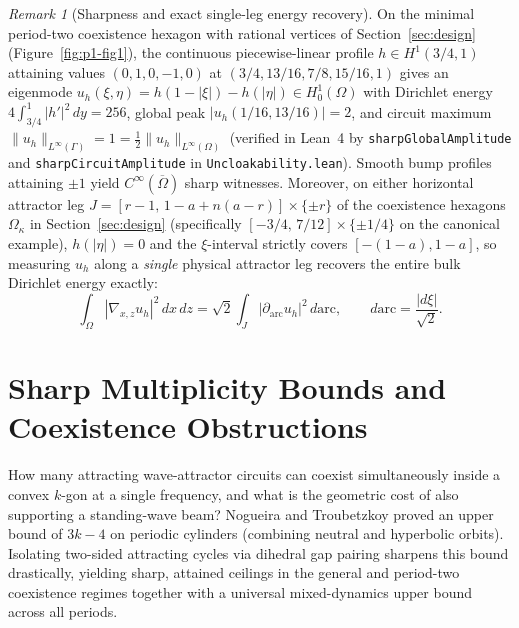 \documentclass[11pt,reqno]{amsart}
\theoremstyle{definition}
\theoremstyle{remark}
\newtheorem{remark}[theorem]{Remark}
\begin{document}
\begin{remark}[Sharpness and exact single-leg energy recovery]
On the minimal period-two coexistence hexagon with rational vertices of Section~\ref{sec:design} (Figure~\ref{fig:p1-fig1}), the continuous piecewise-linear profile $h \in H^1(3/4, 1)$ attaining values $(0, 1, 0, -1, 0)$ at $(3/4, 13/16, 7/8, 15/16, 1)$ gives an eigenmode $u_h(\xi,\eta) = h(1-|\xi|) - h(|\eta|) \in H_0^1(\Omega)$ with Dirichlet energy $4\int_{3/4}^1 |h'|^2\,dy = 256$, global peak $|u_h(1/16, 13/16)| = 2$, and circuit maximum $\|u_h\|_{L^\infty(\Gamma)} = 1 = \frac{1}{2}\|u_h\|_{L^\infty(\Omega)}$ (verified in Lean~4 by \texttt{sharpGlobalAmplitude} and \texttt{sharpCircuitAmplitude} in \texttt{Uncloakability.lean}). Smooth bump profiles attaining $\pm 1$ yield $C^\infty(\overline{\Omega})$ sharp witnesses. Moreover, on either horizontal attractor leg $J = [r-1,\, 1-a+n(a-r)] \times \{\pm r\}$ of the coexistence hexagons $\Omega_\kappa$ in Section~\ref{sec:design} (specifically $[-3/4,\, 7/12] \times \{\pm 1/4\}$ on the canonical example), $h(|\eta|) = 0$ and the $\xi$-interval strictly covers $[-(1-a), 1-a]$, so measuring $u_h$ along a \emph{single} physical attractor leg recovers the entire bulk Dirichlet energy exactly:
\[
  \int_\Omega |\nabla_{x,z} u_h|^2 \, dx\,dz = \sqrt{2} \int_J |\partial_{\mathrm{arc}} u_h|^2 \, d\mathrm{arc}, \qquad d\mathrm{arc} = \frac{|d\xi|}{\sqrt{2}}.
\]
\end{remark}

\section{Sharp Multiplicity Bounds and Coexistence Obstructions}\label{sec:multiplicity}

How many attracting wave-attractor circuits can coexist simultaneously inside a convex $k$-gon at a single frequency, and what is the geometric cost of also supporting a standing-wave beam? Nogueira and Troubetzkoy \cite[Prop.~11]{NogueiraTroubetzkoy2020} proved an upper bound of $3k-4$ on periodic cylinders (combining neutral and hyperbolic orbits). Isolating two-sided attracting cycles via dihedral gap pairing sharpens this bound drastically, yielding sharp, attained ceilings in the general and period-two coexistence regimes together with a universal mixed-dynamics upper bound across all periods.
\end{document}
